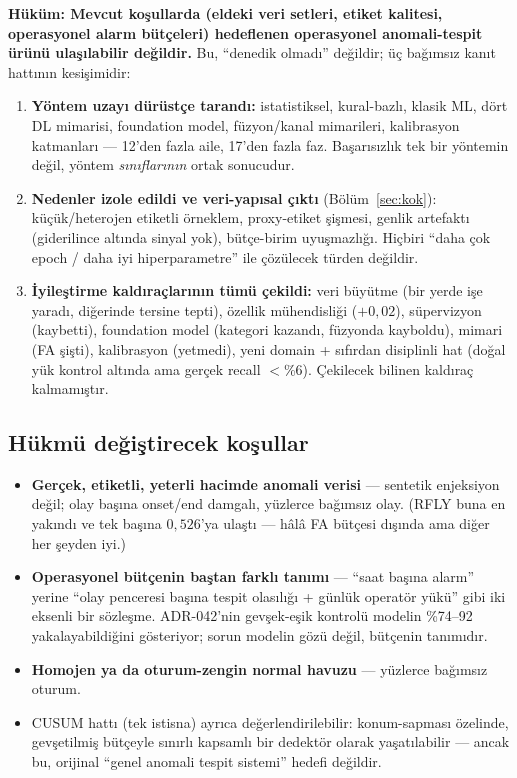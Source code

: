 \documentclass[11pt,a4paper]{article}
\begin{document}
\textbf{Hüküm: Mevcut koşullarda (eldeki veri setleri, etiket kalitesi, operasyonel
alarm bütçeleri) hedeflenen operasyonel anomali-tespit ürünü ulaşılabilir
değildir.} Bu, ``denedik olmadı'' değildir; üç bağımsız kanıt hattının kesişimidir:

\begin{enumerate}[leftmargin=1.4em,itemsep=2pt]
  \item \textbf{Yöntem uzayı dürüstçe tarandı:} istatistiksel, kural-bazlı, klasik
  ML, dört DL mimarisi, foundation model, füzyon/kanal mimarileri, kalibrasyon
  katmanları --- 12'den fazla aile, 17'den fazla faz. Başarısızlık tek bir yöntemin
  değil, yöntem \emph{sınıflarının} ortak sonucudur.
  \item \textbf{Nedenler izole edildi ve veri-yapısal çıktı} (Bölüm~\ref{sec:kok}):
  küçük/heterojen etiketli örneklem, proxy-etiket şişmesi, genlik artefaktı
  (giderilince altında sinyal yok), bütçe-birim uyuşmazlığı. Hiçbiri ``daha çok
  epoch / daha iyi hiperparametre'' ile çözülecek türden değildir.
  \item \textbf{İyileştirme kaldıraçlarının tümü çekildi:} veri büyütme (bir yerde
  işe yaradı, diğerinde tersine tepti), özellik mühendisliği ($+0{,}02$),
  süpervizyon (kaybetti), foundation model (kategori kazandı, füzyonda kayboldu),
  mimari (FA şişti), kalibrasyon (yetmedi), yeni domain + sıfırdan disiplinli hat
  (doğal yük kontrol altında ama gerçek recall $<$\%6). Çekilecek bilinen kaldıraç
  kalmamıştır.
\end{enumerate}

\subsection*{Hükmü değiştirecek koşullar}
\begin{itemize}[leftmargin=1.2em,itemsep=2pt]
  \item \textbf{Gerçek, etiketli, yeterli hacimde anomali verisi} --- sentetik
  enjeksiyon değil; olay başına onset/end damgalı, yüzlerce bağımsız olay. (RFLY
  buna en yakındı ve tek başına $0{,}526$'ya ulaştı --- hâlâ FA bütçesi dışında ama
  diğer her şeyden iyi.)
  \item \textbf{Operasyonel bütçenin baştan farklı tanımı} --- ``saat başına alarm''
  yerine ``olay penceresi başına tespit olasılığı + günlük operatör yükü'' gibi iki
  eksenli bir sözleşme. ADR-042'nin gevşek-eşik kontrolü modelin \%74--92
  yakalayabildiğini gösteriyor; sorun modelin gözü değil, bütçenin tanımıdır.
  \item \textbf{Homojen ya da oturum-zengin normal havuzu} --- yüzlerce bağımsız
  oturum.
  \item CUSUM hattı (tek istisna) ayrıca değerlendirilebilir: konum-sapması özelinde,
  gevşetilmiş bütçeyle sınırlı kapsamlı bir dedektör olarak yaşatılabilir --- ancak
  bu, orijinal ``genel anomali tespit sistemi'' hedefi değildir.
\end{itemize}
\end{document}
